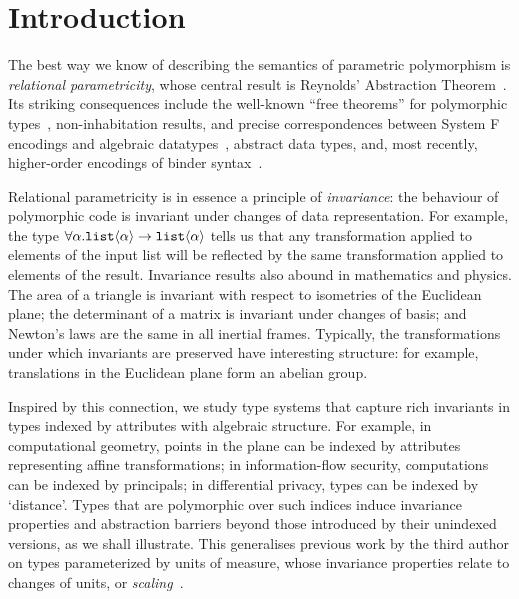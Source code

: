 \section{Introduction}
\label{sec:introduction}
The best way we know of describing the semantics of parametric
polymorphism is \emph{relational parametricity}, whose central result
is Reynolds' Abstraction Theorem~\cite{reynolds83types}. Its striking
consequences include the well-known ``free theorems'' for polymorphic
types~\cite{wadler89theorems}, non-inhabitation results, and precise
correspondences between System F encodings and algebraic
datatypes~\cite{PittsAM:parpoe}, abstract data types, and, most
recently, higher-order encodings of binder
syntax~\cite{syntaxforfree}.

Relational parametricity is in essence a principle of
\emph{invariance}: the behaviour of polymorphic code is invariant
under changes of data representation. For example, the type
$\forall\alpha.\textup{\texttt{list}}\langle \alpha \rangle\to\textup{\texttt{list}}\langle \alpha \rangle$
tells us that any transformation applied to elements of
the input list will be reflected by the same transformation applied
to elements of the result. 
Invariance results also abound in
mathematics and physics. The area of a triangle is invariant with
respect to isometries of the Euclidean plane; the determinant of a
matrix is invariant under changes of basis; and Newton's laws are the
same in all inertial frames. Typically, the 
transformations under which invariants are preserved have interesting structure: 
for example, translations in
the Euclidean plane form an abelian group.

Inspired by this connection, we study type systems that
capture rich invariants in types indexed by attributes with
algebraic structure.  For example, in computational geometry, points
in the plane can be indexed by attributes representing affine
transformations; in information-flow security, computations can be
indexed by principals; in differential privacy, types can be indexed
by `distance'. Types that are polymorphic over such indices induce
invariance properties and abstraction barriers beyond those introduced
by their unindexed versions, as we shall illustrate.  This generalises
previous work by the third author on types parameterized by
units of measure, whose invariance properties relate to changes of
units, or \emph{scaling}~\cite{kennedy97relational}.


